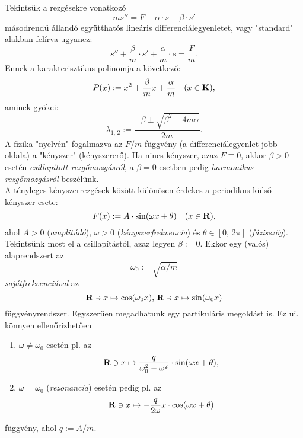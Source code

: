 Tekintsük a rezgésekre vonatkozó
\[
	ms'' = F - \alpha \cdot s - \beta \cdot s'
\]
másodrendű állandó együtthatós lineáris differenciálegyenletet, vagy "standard" alakban felírva ugyanez:
\[
	s'' + \frac{\beta}{m} \cdot s' + \frac{\alpha}{m} \cdot s = \frac{F}{m}.
\]
Ennek a karakterisztikus polinomja a következő:
\[
	P(x) := x^2 + \frac{\beta}{m} x + \frac{\alpha}{m} \quad (x \in \mathbf{K}),
\]
aminek gyökei:
\[
	\lambda_{1, \, 2} := \frac{- \beta \pm \sqrt{\beta^2 - 4m \alpha}}{2m}.
\]
A fizika "nyelvén" fogalmazva az $F / m$ függvény (a differenciálegyenlet jobb oldala) a "kényszer" (kényszererő). Ha nincs kényszer, azaz $F \equiv 0$, akkor $\beta > 0$ esetén \textit{csillapított rezgőmozgásról}, a $\beta = 0$ esetben pedig \textit{harmonikus rezgőmozgásról} beszélünk.\\

A tényleges kényszerrezgések között különösen érdekes a periodikus külső kényszer esete:
\[
	F(x) := A \cdot \sin(\omega x + \theta) \quad (x \in \mathbf{R}),
\]
ahol $A > 0$ (\textit{amplitúdó}), $\omega > 0$ (\textit{kényszerfrekvencia}) és $\theta \in [0, \, 2\pi]$ (\textit{fázisszög}). Tekintsünk most el a csillapítástól, azaz legyen $\beta := 0$. Ekkor egy (valós) alaprendszert az
\[
	\omega_0 := \sqrt{\alpha / m}
\]
\textit{sajátfrekvenciával} az
\[
	\mathbf{R} \ni x \mapsto \cos(\omega_0 x), \, \mathbf{R} \ni x \mapsto \sin(\omega_0 x)
\]
függvényrendszer. Egyszerűen megadhatunk egy partikuláris megoldást is. Ez ui. könnyen ellenőrizhetően
\begin{enumerate}
	\item $\omega \neq \omega_0$ esetén pl. az
	\[
		\mathbf{R} \ni x \mapsto \frac{q}{\omega_0^2 - \omega^2} \cdot \sin(\omega x + \theta),
	\]
	\item $\omega = \omega_0$ (\textit{rezonancia}) esetén pedig pl. az
	\[
		\mathbf{R} \ni x \mapsto -\frac{q}{2 \omega} x \cdot \cos(\omega x + \theta)
	\]
\end{enumerate}
függvény, ahol $q := A / m$.\\

